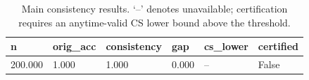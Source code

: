 \begin{table}[t]
\centering
\begin{tabular}{llllll}
\toprule
n & orig_acc & consistency & gap & cs_lower & certified \\
\midrule
200.000 & 1.000 & 1.000 & 0.000 & -- & False \\
\bottomrule
\end{tabular}
\caption{Main consistency results. `--' denotes unavailable; certification requires an anytime-valid CS lower bound above the threshold.}
\end{table}
